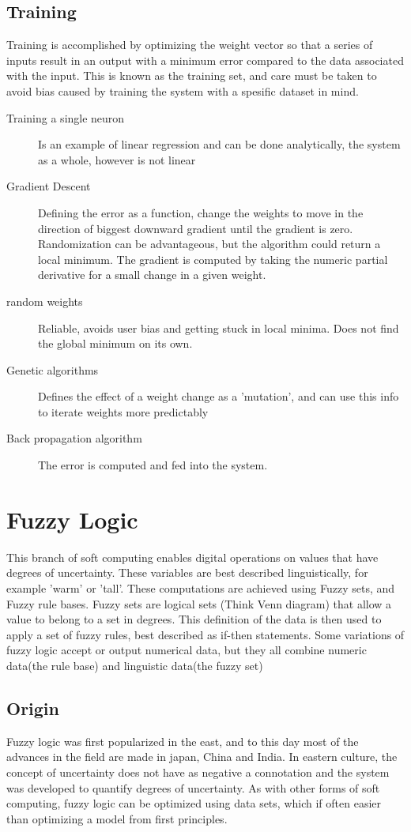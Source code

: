 \documentclass{report}
\begin{document}
\subsection{Training}
Training is accomplished by optimizing the weight vector so that a series of inputs result in an output with a minimum error compared to the data associated with the input. This is known as the training set, and care must be taken to avoid bias caused by training the system with a spesific dataset in mind. 
\begin{description}
	\item[Training a single neuron] Is an example of linear regression and can be done analytically, the system as a whole, however is not linear
	\item[Gradient Descent] Defining the error as a function, change the weights to move in the direction of biggest downward gradient until the gradient is zero. Randomization can be advantageous, but the algorithm could return a local minimum. The gradient is computed by taking the numeric partial derivative for a small change in a given weight. 
	\item[random weights] Reliable, avoids user bias and getting stuck in local minima. Does not find the global minimum on its own.
	\item[Genetic algorithms] Defines the effect of a weight change as a 'mutation', and can use this info to iterate weights more predictably
	\item[Back propagation algorithm] The error is computed and fed into the system. 
\end{description}
\section{Fuzzy Logic}
This branch of soft computing enables digital operations on values that have degrees of uncertainty. These variables are best described linguistically, for example 'warm' or 'tall'. These computations are achieved using Fuzzy sets, and Fuzzy rule bases. Fuzzy sets are logical sets (Think Venn diagram) that allow a value to belong to a set in degrees. This definition of the data is then used to apply a set of fuzzy rules, best described as if-then statements. Some variations of fuzzy logic accept or output numerical data, but they all combine numeric data(the rule base) and linguistic data(the fuzzy set)
\subsection{Origin}
Fuzzy logic was first popularized in the east, and to this day most of the advances in the field are made in japan, China and India. In eastern culture, the concept of uncertainty does not have as negative a connotation and the system was developed to quantify degrees of uncertainty. As with other forms of soft computing, fuzzy logic can be optimized using data sets, which if often easier than optimizing a model from first principles.
\end{document}
